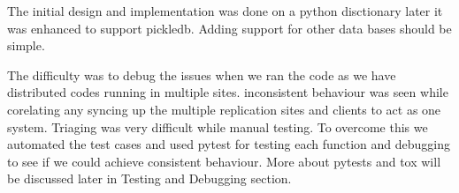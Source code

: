 The initial design and implementation was done on a python disctionary later it was enhanced to support pickledb. Adding support for other data bases should be simple.

The difficulty was to debug the issues when we ran the code as we have distributed codes running in multiple sites.   inconsistent behaviour was seen while corelating any syncing up the multiple replication sites and clients to act as one system.  Triaging was very difficult while manual testing. To overcome this we automated the test cases and used  pytest for testing each function and debugging to see if we could achieve consistent behaviour. More about pytests and tox will be discussed later in Testing and Debugging section.

\newpage